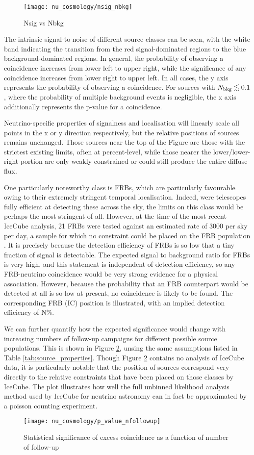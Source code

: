\begin{figure}[!ht]
	\centering \texttt{[image: nu\_cosmology/nsig\_nbkg]}
	\caption{Nsig vs Nbkg}
	\label{fig:nsig_nbkg}
\end{figure}

The intrinsic signal-to-noise of different source classes can be seen, with the white band indicating the transition from the red signal-dominated regions to the blue background-dominated regions. In general, the probability of observing a coincidence increases from lower left to upper right, while the significance of any coincidence increases from lower right to upper left. In all cases, the y axis represents the probability of observing a coincidence. For sources with $N_{\textup{bkg}} \lesssim 0.1$, where the probability of multiple background events is negligible, the x axis additionally represents the p-value for a coincidence. 

Neutrino-specific properties of signalness and localisation will linearly scale all points in the x or y direction respectively, but the relative positions of sources remains unchanged. Those sources near the top of the Figure are those with the strictest existing limits, often at percent-level, while those nearer the lower/lower-right portion are only weakly constrained or could still produce the entire diffuse flux. 

One particularly noteworthy class is FRBs, which are particularly favourable owing to their extremely stringent temporal localisation. Indeed, were telescopes fully efficient at detecting these across the sky, the limits on this class would be perhaps the most stringent of all. However, at the time of the most recent IceCube analysis, 21 FRBs were tested against an estimated rate of 3000 per sky per day, a sample for which no constraint could be placed on the FRB population . It is precisely because the detection efficiency of FRBs is so low that a tiny fraction of signal is detectable. The expected signal to background ratio for FRBs is very high, and this statement is independent of detection efficiency, so any FRB-neutrino coincidence would be very strong evidence for a physical association. However, because the probability that an FRB counterpart would be detected at all is so low at present, no coincidence is likely to be found. The corresponding FRB (IC) position is illustrated, with an implied detection efficiency of N\%. 

We can further quantify how the expected significance would change with increasing numbers of follow-up campaigns for different possible source populations. This is shown in Figure \ref{fig:p_value}, unsing the same assumptions listed in Table \ref{tab:source_properties}. Though Figure \ref{fig:p_value} contains no analysis of IceCube data, it is particularly notable that the position of sources correspond very directly to the relative constraints that have been placed on those classes by IceCube. The plot illustrates how well the full unbinned likelihood analysis method used by IceCube for neutrino astronomy can in fact be approximated by a poisson counting experiment.

\begin{figure}[!ht]
	\centering \texttt{[image: nu\_cosmology/p\_value\_nfollowup]}
	\caption{Statistical significance of excess coincidence as a function of number of follow-up}
	\label{fig:p_value}
\end{figure}
